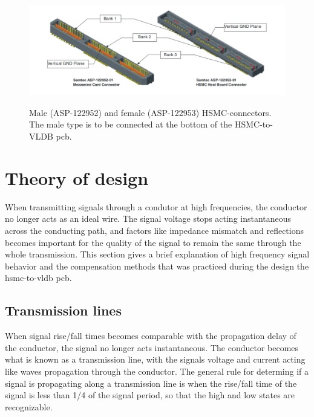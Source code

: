 \documentclass[main.tex]{subfiles}
\begin{document}
\begin{figure}[ht] %
\includegraphics[width=\linewidth]{../img/HSMC_52_53_hsmcspec}  \\[0.5cm]
\caption{Male (ASP-122952) and female (ASP-122953) HSMC-connectors. The male type is to be connected at the bottom of the HSMC-to-VLDB \gls{pcb}. \cite[Figure 2-1]{altera_hsmc09}}
\label{fig:hsmc}
\end{figure}

\section{Theory of design}

When transmitting signals through a condutor at high frequencies, the conductor no longer acts as an ideal wire. The signal voltage stops acting instantaneous across the conducting path, and factors like impedance mismatch and reflections becomes important for the quality of the signal to remain the same through the whole transmission. This section gives a brief explanation of high frequency signal behavior and the compensation methods that was practiced during the design the \gls{hsmc}-to-\gls{vldb} \gls{pcb}.


\subsection{Transmission lines}

When signal rise/fall times becomes comparable with the propagation delay of the conductor, the signal no longer acts instantaneous. The conductor becomes what is known as a transmission line, with the signals voltage and current acting like waves propagation through the conductor. 
The general rule for determing if a signal is propagating along a transmission line is when the rise/fall time of the signal is less than 1/4 of the signal period, so that the high and low states are recognizable. \cite{weste11} 
\end{document}
